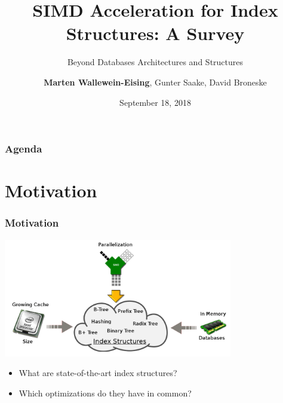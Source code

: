 \documentclass{beamer}
\title[SIMD Acceleration for main-memory Index Structures: A Survey]{SIMD Acceleration for  Index Structures: A Survey}
\subtitle{Beyond Databases Architectures and Structures}
\author[Wallewein-Eising et al.]{\textbf{Marten Wallewein-Eising}, Gunter Saake, David Broneske}
\date{September 18, 2018}
\institute{University of Magdeburg}
\begin{document}
\begin{frame}[plain]
\titlepage


\end{frame}

\section[Agenda]{}
\begin{frame}
\frametitle{Agenda}
\tableofcontents
\end{frame}

\section{Motivation}
\begin{frame}
\frametitle{Motivation}
\begin{center}
\includegraphics[width=0.75\textwidth]{img/big_picture.pdf}
\end{center}
\begin{itemize}[label=\textbullet,leftmargin=1em]
\item What are state-of-the-art index structures?
\item Which optimizations do they have in common?
\end{itemize}
\end{frame}
\end{document}
